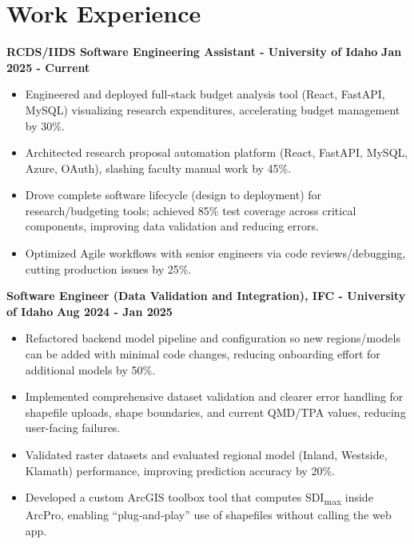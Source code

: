

\vspace{-10pt}

\section*{Work Experience}
\textbf{RCDS/IIDS Software Engineering Assistant - University of Idaho} \hfill \textbf{Jan 2025 - Current}
\begin{itemize}[leftmargin=*, itemsep=1pt]
\item Engineered and deployed full-stack budget analysis tool (React, FastAPI, MySQL) visualizing research expenditures, accelerating budget management by 30\%.
\item Architected research proposal automation platform (React, FastAPI, MySQL, Azure, OAuth), slashing faculty manual work by 45\%.
\item Drove complete software lifecycle (design to deployment) for research/budgeting tools; achieved 85\% test coverage across critical components, improving data validation and reducing errors.
\item Optimized Agile workflows with senior engineers via code reviews/debugging, cutting production issues by 25\%.
\end{itemize}

\textbf{Software Engineer (Data Validation and Integration), IFC - University of Idaho} \hfill \textbf{Aug 2024 - Jan 2025}
\begin{itemize}[leftmargin=*, itemsep=1pt]
\item Refactored backend model pipeline and configuration so new regions/models can be added with minimal code changes, reducing onboarding effort for additional models by 50\%.
\item Implemented comprehensive dataset validation and clearer error handling for shapefile uploads, shape boundaries, and current QMD/TPA values, reducing user-facing failures.
\item Validated raster datasets and evaluated regional model (Inland, Westside, Klamath) performance, improving prediction accuracy by 20\%.

\item Developed a custom ArcGIS toolbox tool that computes SDI\textsubscript{max} inside ArcPro, enabling “plug‑and‑play” use of shapefiles without calling the web app.
\end{itemize}


